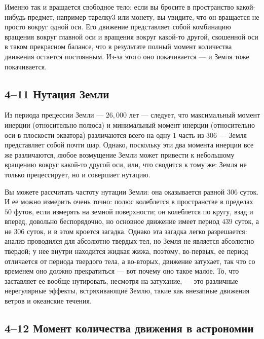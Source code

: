 \documentclass[11pt,oneside]{article}
\begin{document}
Именно так и вращается свободное тело: если вы бросите в пространство какой-нибудь предмет, например тарелку3 или монету, вы увидите, что он вращается не просто вокруг одной оси. Его движение представляет собой комбинацию вращения вокруг главной оси и вращения вокруг какой-то другой, скошенной оси в таком прекрасном балансе, что в результате полный момент количества движения остается постоянным. Из-за этого оно покачивается --- и Земля тоже покачивается.\par

\subsection*{4--11 Нутация Земли}

Из периода прецессии Земли --- \(26,000\) лет --- следует, что максимальный момент инерции (относительно полюса) и минимальный момент инерции (относительно оси в плоскости экватора) различаются всего на одну \(1\) часть из \(306\) --- Земля представляет собой почти шар. Однако, поскольку эти два момента инерции все же различаются, любое возмущение Земли может привести к небольшому вращению вокруг какой-то другой оси, или, что сводится к тому же: Земля не только прецессирует, но и совершает нутацию.\par

Вы можете рассчитать частоту нутации Земли: она оказывается равной \(306\) суток. И ее можно измерить очень точно: полюс колеблется в пространстве в пределах \(50\) футов, если измерять на земной поверхности; он колеблется по кругу, взад и вперед, довольно беспорядочно, но основное движение имеет период \(439\) суток, а не \(306\) суток, и в этом кроется загадка. Однако эта загадка легко разрешается: анализ проводился для абсолютно твердых тел, но Земля не является абсолютно твердой; у нее внутри находится жидкая жижа, поэтому, во-первых, ее период отличается от периода твердого тела, а во-вторых, движение затухает, так что со временем оно должно прекратиться --- вот почему оно такое малое. То, что заставляет ее вообще нутировать, несмотря на затухание, --- это различные нерегулярные эффекты, встряхивающие Землю, такие как внезапные движения ветров и океанские течения.\par

\subsection*{4--12 Момент количества движения в астрономии}
\end{document}
